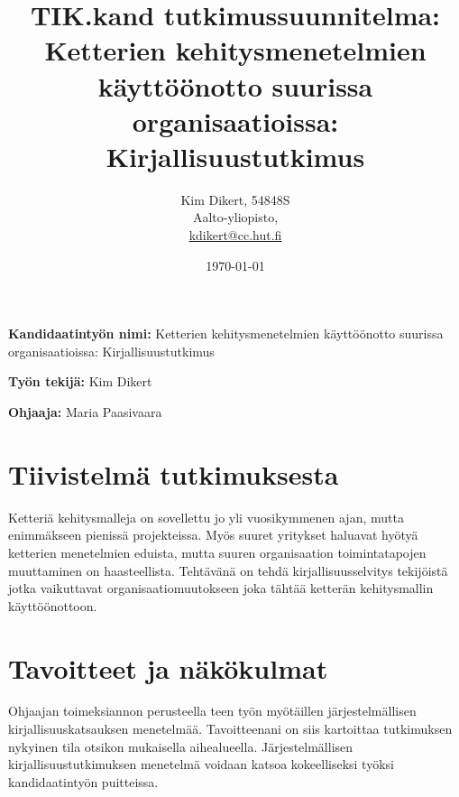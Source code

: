 \documentclass[12pt,a4paper,finnish,oneside]{article}
\begin{document}

\title{TIK.kand tutkimussuunnitelma:\\[5mm]
Ketterien kehitysmenetelmien käyttöönotto suurissa organisaatioissa: Kirjallisuustutkimus}

\author{Kim Dikert, 54848S\\
Aalto-yliopisto,\\
\url{kdikert@cc.hut.fi}}

\date{\today}

\maketitle


\vspace{10mm}

%

\textbf{Kandidaatintyön nimi:} Ketterien kehitysmenetelmien käyttöönotto suurissa organisaatioissa: Kirjallisuustutkimus

\textbf{Työn tekijä:} Kim Dikert

\textbf{Ohjaaja:} Maria Paasivaara


\section{Tiivistelmä tutkimuksesta}

Ketteriä kehitysmalleja on sovellettu jo yli vuosikymmenen ajan, mutta
enimmäkseen pienissä projekteissa. Myös suuret yritykset haluavat hyötyä
ketterien menetelmien eduista, mutta suuren organisaation toimintatapojen
muuttaminen on haasteellista. Tehtävänä on tehdä kirjallisuusselvitys tekijöistä
jotka vaikuttavat organisaatiomuutokseen joka tähtää ketterän kehitysmallin
käyttöönottoon.


\section{Tavoitteet ja näkökulmat}

Ohjaajan toimeksiannon perusteella teen työn myötäillen järjestelmällisen
kirjallisuuskatsauksen menetelmää. Tavoitteenani on siis kartoittaa tutkimuksen
nykyinen tila otsikon mukaisella aihealueella. Järjestelmällisen
kirjallisuustutkimuksen menetelmä voidaan katsoa kokeelliseksi työksi
kandidaatintyön puitteissa.
\end{document}
